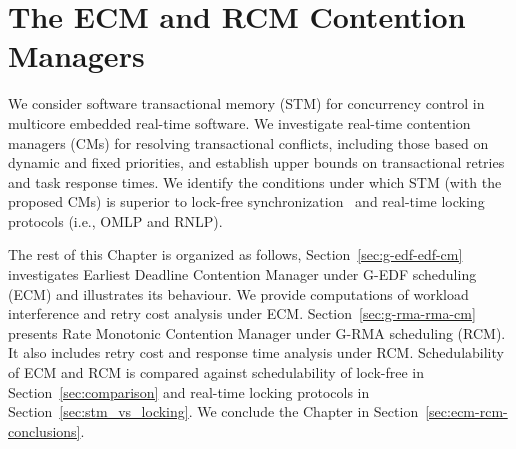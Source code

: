 \chapter{\label{ecm-rcm}The ECM and RCM Contention Managers}
%
We consider software transactional memory (STM) for concurrency control in multicore embedded real-time software. We investigate real-time contention managers (CMs) for resolving transactional conflicts, including those based on dynamic and fixed priorities, and establish upper bounds on transactional retries and task response times. We identify the conditions under which STM (with the proposed CMs) is superior to lock-free synchronization~\cite{stmconcurrencycontrol:emsoft11} and real-time locking protocols (i.e., OMLP\cite{springerlink:10.1007/s10617-012-9090-1,key-3} and RNLP\cite{6257574}).

The rest of this Chapter is organized as follows, Section~\ref{sec:g-edf-edf-cm} investigates Earliest Deadline Contention Manager under G-EDF scheduling (ECM) and illustrates its behaviour. We provide computations of workload interference and retry cost analysis under ECM. Section~\ref{sec:g-rma-rma-cm} presents Rate Monotonic Contention Manager under G-RMA scheduling (RCM). It also includes retry cost and response time analysis under RCM. Schedulability of ECM and RCM is compared against schedulability of lock-free in Section~\ref{sec:comparison} and real-time locking protocols in Section~\ref{sec:stm_vs_locking}. We conclude the Chapter in Section~\ref{sec:ecm-rcm-conclusions}.
%
